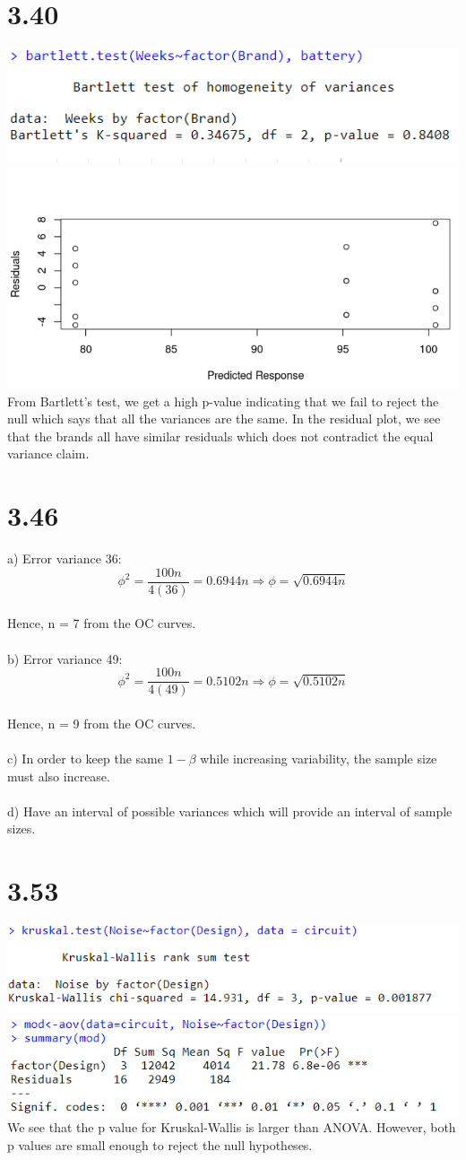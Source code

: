 \documentclass{article}
\begin{document}
\section*{3.40}
\includegraphics{3.40.PNG}
\\\includegraphics{3.40sp.PNG}
\\From Bartlett's test, we get a high p-value indicating that we fail to reject the null which says that all the variances are the same. In the residual plot, we see that the brands all have similar residuals which does not contradict the equal variance claim.
\newpage
\section*{3.46}
a) Error variance 36: $$\phi^2 = \frac{100n}{4(36)} = 0.6944n \Rightarrow \phi = \sqrt{0.6944n}$$
\\Hence, n = 7 from the OC curves.
\\
\\b) Error variance 49: $$\phi^2 = \frac{100n}{4(49)} = 0.5102n \Rightarrow \phi = \sqrt{0.5102n}$$
\\Hence, n = 9 from the OC curves.
\\
\\c) In order to keep the same $1-\beta$ while increasing variability, the sample size must also increase.
\\
\\d) Have an interval of possible variances which will provide an interval of sample sizes.
\\
\section*{3.53}
\includegraphics{3.53.PNG}
\\\includegraphics{3.53aov.PNG}
\\We see that the p value for Kruskal-Wallis is larger than ANOVA. However, both p values are small enough to reject the null hypotheses.
\end{document}
